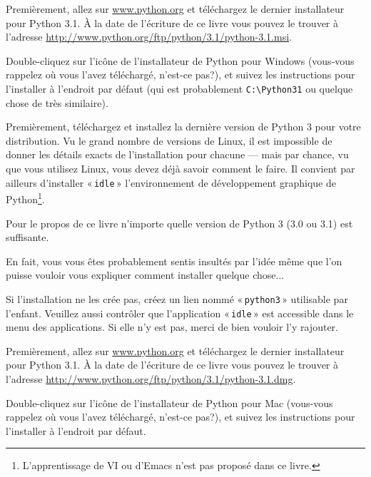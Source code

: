 \begin{WINDOWS}
Premièrement, allez sur \url{www.python.org} et téléchargez le dernier installateur pour Python 3.1. À la date de l'écriture de ce livre vous pouvez le trouver à l'adresse  \url{http://www.python.org/ftp/python/3.1/python-3.1.msi}.

Double-cliquez sur l'icône de l'installateur de Python pour Windows (vous-vous rappelez où vous l'avez téléchargé, n'est-ce pas?), et suivez les instructions pour l'installer à l'endroit par défaut (qui est probablement \verb+C:\Python31+ ou quelque chose de très similaire).
\end{WINDOWS}

\begin{LINUX}
Premièrement, téléchargez et installez la dernière version de Python 3 pour votre distribution. Vu le grand nombre de versions de Linux, il est impossible de donner les détails exacts de l'installation pour chacune --- mais par chance, vu que vous utilisez Linux, vous devez déjà savoir comment le faire. Il convient par ailleurs d'installer « \texttt{idle} » l'environnement de développement graphique de Python\footnote{L'apprentissage de VI ou d'Emacs n'est pas proposé dans ce livre.}.  

Pour le propos de ce livre n'importe quelle version de Python 3 (3.0 ou 3.1) est suffisante. 

En fait, vous vous êtes probablement sentis insultés par l'idée même que l'on puisse vouloir vous expliquer comment installer quelque chose...

Si l'installation ne les crée pas, créez un lien nommé « \texttt{python3} » utilisable par l'enfant. Veuillez aussi contrôler que l'application « \texttt{idle} » est accessible dans le menu des applications. Si elle n'y est pas, merci de bien vouloir l'y rajouter.
\end{LINUX}

\begin{MAC}
Premièrement, allez sur \url{www.python.org} et téléchargez le dernier installateur pour Python 3.1. À la date de l'écriture de ce livre vous pouvez le trouver à l'adresse  \url{http://www.python.org/ftp/python/3.1/python-3.1.dmg}.

Double-cliquez sur l'icône de l'installateur de Python pour Mac (vous-vous rappelez où vous l'avez téléchargé, n'est-ce pas?), et suivez les instructions pour l'installer à l'endroit par défaut.
\end{MAC}
  
